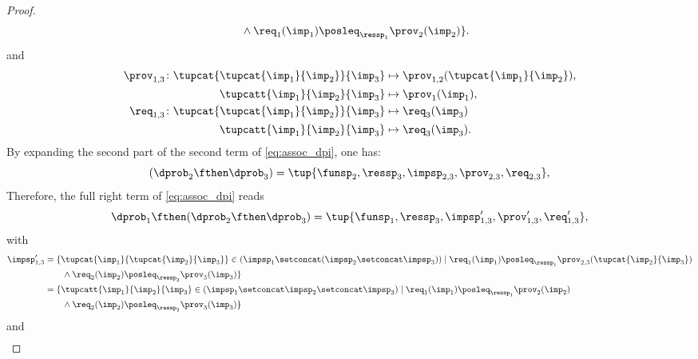 \begin{proof}
\begin{equation}
\begin{aligned}
      &\qquad \wedge \req_{1}(\imp_{1})\posleq_{\ressp_1}\prov_2(\imp_2)\}.
    \end{aligned}
\end{equation}
  and
  \begin{equation}
  \begin{aligned}
    \prov_{1,3} \colon \tupcat {\tupcat {\imp_{1}} {\imp_{2}}} {\imp_{3}}   &\mapsto\prov_{1,2}(\tupcat {\imp_{1}} {\imp_{2}}),\\
    \tupcatt{\imp_{1}}{\imp_{2}}{\imp_{3}}&\mapsto \prov_1(\imp_{1}),\\
    \req_{1,3} \colon \tupcat {\tupcat {\imp_{1}} {\imp_{2}}} {\imp_{3}} &\mapsto\req_{3}(\imp_{3})\\
    \tupcatt{\imp_{1}}{\imp_{2}}{\imp_{3}}&\mapsto\req_{3}(\imp_{3}).
  \end{aligned}
  \end{equation}
  By expanding the second part of the second term of \cref{eq:assoc_dpi}, one has:
  \begin{equation}
    (\dprob_{2} \fthen \dprob_{3})
    =
    \tup{ \funsp_{2},\ressp_{3},\impsp_{2,3},\prov_{2,3},\req_{2,3}},
  \end{equation}
  Therefore, the full right term of \cref{eq:assoc_dpi} reads
  \begin{equation}
    \label{eq:dpi_ass_2}
    \dprob_{1} \fthen (\dprob_{2}\fthen \dprob_{3})=\tup{ \funsp_{1},\ressp_{3},\impsp'_{1,3},\prov'_{1,3},\req'_{1,3}},
  \end{equation}
  with
  \begin{equation}
    \begin{aligned}
    \impsp_{1,3}'  &=  \{  \tupcat {\imp_{1}} {\tupcat {\imp_{2}} {\imp_{3}}} \in (\impsp_{1} \setconcat (\impsp_{2}\setconcat \impsp_{3}))\mid\req_{1}(\imp_{1})\posleq_{\ressp_{1}}\prov_{2,3}(\tupcat {\imp_{2}} {\imp_{3}})\\
      &\qquad \wedge \req_2(\imp_2)\posleq_{\ressp_2}\prov_3(\imp_3)\}\\
      &=\{  \tupcatt{\imp_{1}}{\imp_{2}}{\imp_{3}} \in (\impsp_{1} \setconcat \impsp_{2}\setconcat \impsp_{3})\mid\req_{1}(\imp_{1})\posleq_{\ressp_{1}}\prov_{2}(\imp_2)\\
      &\qquad \wedge \req_2(\imp_2)\posleq_{\ressp_2}\prov_3(\imp_3)\}\\
    \end{aligned}
\end{equation}
  and
  \begin{equation}
  \begin{aligned}

\end{aligned}
\end{equation}
\end{proof}
